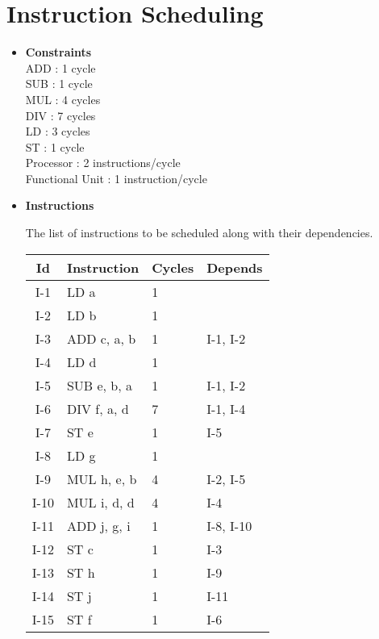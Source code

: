 \section{Instruction Scheduling}

\begin{itemize}

\item \textbf{Constraints} \\
  ADD : 1 cycle \\
  SUB : 1 cycle \\
  MUL : 4 cycles \\
  DIV : 7 cycles \\
  LD  : 3 cycles \\
  ST  : 1 cycle \\

  Processor : 2 instructions/cycle \\
  Functional Unit : 1 instruction/cycle \\

\item \textbf{Instructions}

  The list of instructions to be scheduled along with their dependencies.
  
\begin{table}[!ht]
\centering
\begin{tabular}{c|l|l|l}
  \toprule
  \toprule
  \textbf{Id} & \textbf{Instruction} & \textbf{Cycles} & \textbf{Depends} \\
  \midrule
  I-1   &  LD a         & 1  &          \\ \hline
  I-2   &  LD b         & 1  &          \\ \hline
  I-3   &  ADD c, a, b  & 1  & I-1, I-2 \\ \hline
  I-4   &  LD d         & 1  &          \\ \hline
  I-5   &  SUB e, b, a  & 1  & I-1, I-2 \\ \hline
  I-6   &  DIV f, a, d  & 7  & I-1, I-4 \\ \hline
  I-7   &  ST e         & 1  & I-5      \\ \hline
  I-8   &  LD g         & 1  &          \\ \hline
  I-9   &  MUL h, e, b  & 4  & I-2, I-5 \\ \hline
  I-10  &  MUL i, d, d  & 4  & I-4      \\ \hline
  I-11  &  ADD j, g, i  & 1  & I-8, I-10 \\ \hline
  I-12  &  ST c         & 1  & I-3      \\ \hline
  I-13  &  ST h         & 1  & I-9      \\ \hline
  I-14  &  ST j         & 1  & I-11     \\ \hline
  I-15  &  ST f         & 1  & I-6      \\ \hline
  \bottomrule
\end{tabular}
\end{table}  
  

\end{itemize}
